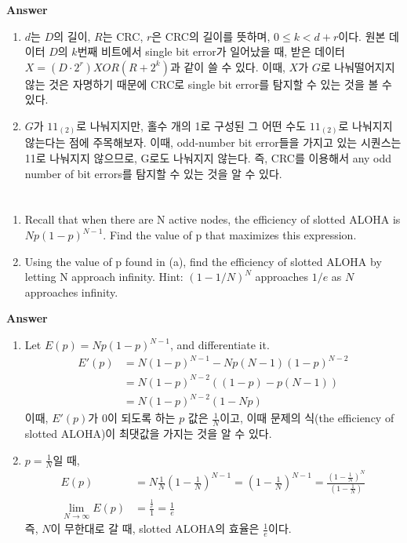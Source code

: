 \documentclass{article}
\begin{document}
    \noindent
    \textbf{Answer} \\
    \begin{enumerate} [label=\alph*. ]
        \item $d$는 $D$의 길이, $R$는 CRC, $r$은 CRC의 길이를 뜻하며, $0 \leq k < d+r$이다. 원본 데이터 $D$의 $k$번째 비트에서 single bit error가 일어났을 때, 받은 데이터 $X=(D\cdot 2^r) XOR (R + 2^k)$과 같이 쓸 수 있다. 이때, $X$가 $G$로 나눠떨어지지 않는 것은 자명하기 때문에 CRC로 single bit error를 탐지할 수 있는 것을 볼 수 있다.
        \item $G$가 $11_{(2)}$로 나눠지지만, 홀수 개의 1로 구성된 그 어떤 수도 $11_{(2)}$로 나눠지지 않는다는 점에 주목해보자. 이때, odd-number bit error들을 가지고 있는 시퀀스는 11로 나눠지지 않으므로, G로도 나눠지지 않는다. 즉, CRC를 이용해서 any odd number of bit errors를 탐지할 수 있는 것을 알 수 있다.
    \end {enumerate}
    \vspace{2em}
    \section{}
    \begin{enumerate}[label=\alph*. ]
        \item Recall that when there are N active nodes, the efficiency of slotted ALOHA is $Np(1−p)^{N-1}$. Find the value of p that maximizes this expression.\\
        \item Using the value of p found in (a), find the efficiency of slotted ALOHA by letting N approach infinity. Hint: $(1−1/ N)^N$ approaches $1/e$ as $N$ approaches infinity.\\
    \end {enumerate}
    \noindent
    \textbf{Answer} \\
    \begin{enumerate} [label=\alph*. ]
        \item Let $E(p) = Np(1-p)^{N-1}$, and differentiate it.
              \begin{align*}
                  E'(p) &= N(1-p)^{N-1} - Np(N-1)(1-p)^{N-2} \\
                  &= N(1-p)^{N-2}((1-p) - p(N-1)) \\
                  &= N(1-p)^{N-2}(1-Np)
              \end{align*}
              이때, $E'(p)$가 0이 되도록 하는 $p$ 값은 $\frac{1}{N}$이고, 이때 문제의 식(the efficiency of slotted ALOHA)이 최댓값을 가지는 것을 알 수 있다.
        \item $p=\frac{1}{N}$일 때,
              \begin{align*}
                   E(p) &= N\frac{1}{N}(1-\frac{1}{N})^{N-1} = (1-\frac{1}{N})^{N-1} = \frac{(1-\frac{1}{N})^{N}}{(1-\frac{1}{N})} \\
                   \lim_{N\to\infty} E(p) &= \frac{\frac{1}{e}}{1} = \frac{1}{e}
              \end{align*}
              즉, $N$이 무한대로 갈 때, slotted ALOHA의 효율은 $\frac{1}{e}$이다.
    \end {enumerate}
\end{document}
